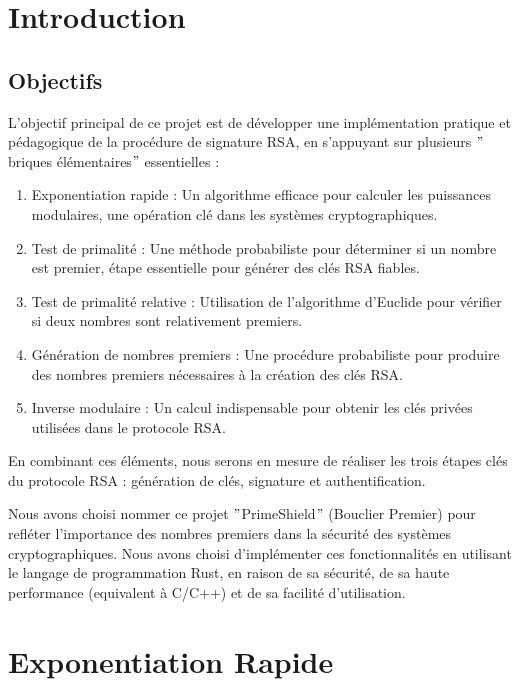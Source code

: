 \documentclass[11pt]{article}
\begin{document}
    \section{Introduction}\label{sec:introduction}

    \subsection{Objectifs}\label{subsec:objectifs}

    L'objectif principal de ce projet est de développer une implémentation pratique et pédagogique de la procédure de signature RSA, en s'appuyant sur plusieurs \("\)briques élémentaires\("\) essentielles :

    \begin{enumerate}
        \item Exponentiation rapide : Un algorithme efficace pour calculer les puissances modulaires, une opération clé dans les systèmes cryptographiques.
        \item Test de primalité : Une méthode probabiliste pour déterminer si un nombre est premier, étape essentielle pour générer des clés RSA fiables.
        \item Test de primalité relative : Utilisation de l'algorithme d'Euclide pour vérifier si deux nombres sont relativement premiers.
        \item Génération de nombres premiers : Une procédure probabiliste pour produire des nombres premiers nécessaires à la création des clés RSA\@.
        \item Inverse modulaire : Un calcul indispensable pour obtenir les clés privées utilisées dans le protocole RSA\@.
    \end{enumerate}

    En combinant ces éléments, nous serons en mesure de réaliser les trois étapes clés du protocole RSA : génération de clés, signature et authentification.

    Nous avons choisi nommer ce projet \("\)PrimeShield\("\) (Bouclier Premier) pour refléter l'importance des nombres premiers dans la sécurité des systèmes cryptographiques.
    Nous avons choisi d'implémenter ces fonctionnalités en utilisant le langage de programmation Rust, en raison de sa sécurité, de sa haute performance (equivalent à C/C++) et de sa facilité d'utilisation.


    \section{Exponentiation Rapide}\label{sec:exponentiation-rapide}
\end{document}
